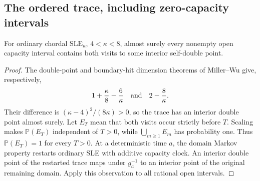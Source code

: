 \subsection{The ordered trace, including zero-capacity intervals}

\begin{lemma}
\label{chordal:dense-doubles}
For ordinary chordal $\mathrm{SLE}_\kappa$, $4<\kappa<8$, almost surely
every nonempty open capacity interval contains both visits to some
interior self-double point.
\end{lemma}
\begin{proof}
The double-point and boundary-hit dimension theorems of Miller--Wu
\cite[Theorem~1.1 and Corollary~1.7]{MillerWu2017} give, respectively,
\[
 1+\frac\kappa8-\frac6\kappa
 \quad\hbox{and}\quad 2-\frac8\kappa.
\]
Their difference is $(\kappa-4)^2/(8\kappa)>0$, so the trace has
an interior double point almost surely.  Let $E_T$ mean that both
visits occur strictly before $T$.  Scaling makes $\mathbb P(E_T)$
independent of $T>0$, while $\bigcup_{m\ge1}E_m$ has probability one.
Thus $\mathbb P(E_T)=1$ for every $T>0$.  At a deterministic time $a$,
the domain Markov property restarts ordinary SLE with additive
capacity clock.  An interior double point of the restarted trace
maps under $g_a^{-1}$ to an interior point of the original remaining
domain.  Apply this observation to all rational open intervals.
\end{proof}


